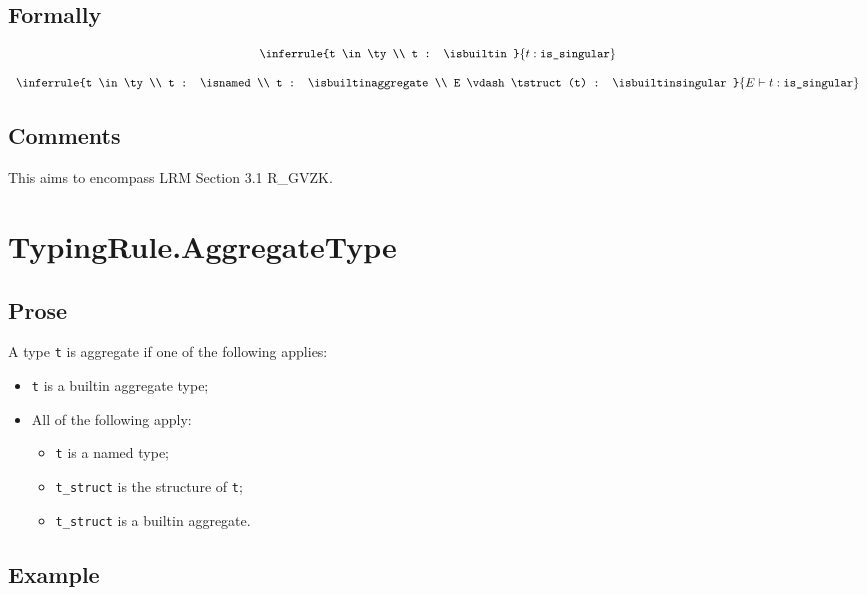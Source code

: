 \documentclass{book}
\begin{document}
\begin{formal}
      \subsection{Formally}
\newcommand\issingular[0]{\texttt{is\_singular}}
\[
\begin{array}{c}
\inferrule{t \in \ty \\ t : \isbuiltin}{t : \issingular}\\
\\
\inferrule{t \in \ty \\ t : \isnamed \\ t : \isbuiltinaggregate \\
E \vdash \tstruct(t) : \isbuiltinsingular}{
E \vdash t : \issingular}
\end{array}
\]      

\end{formal}

    \subsection{Comments}
    This aims to encompass LRM Section 3.1 R\_GVZK.

\section{TypingRule.AggregateType}

    \subsection{Prose}
    A type \texttt{t} is aggregate if one of the following applies:
    \begin{itemize}
    \item \texttt{t} is a builtin aggregate type;
    \item All of the following apply:
      \begin{itemize}
      \item \texttt{t} is a named type;
      \item \texttt{t\_struct} is the structure of \texttt{t};
      \item \texttt{t\_struct} is a builtin aggregate. 
      \end{itemize}
    \end{itemize}

    \subsection{Example}
\end{document}
